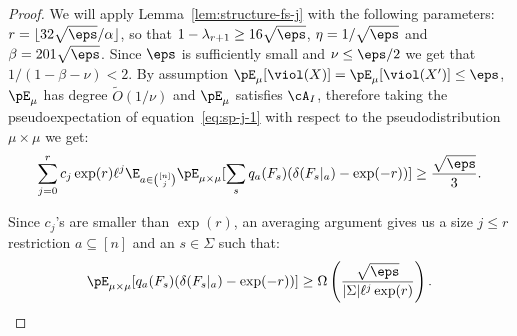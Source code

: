 \begin{proof}


We will apply Lemma~\ref{lem:structure-fs-j} with the following parameters: $r = \lfloor 32\sqrt{\eps}/\alpha \rfloor$, so that $1 - \lambda_{r+1} \geq 16\sqrt{\eps}$,  $\eta = 1/\sqrt{\eps}$ and $\beta = 201\sqrt{\eps}$.
Since $\eps$ is sufficiently small and $\nu \leq \eps/2$ we get that $1/(1 - \beta - \nu) < 2$. By assumption $\pE_\mu[\viol(X)] = \pE_\mu[\viol(X')] \le \eps$, $\pE_\mu$ has degree $\widetilde{O}(1/\nu)$ and $\pE_\mu$ satisfies $\cA_I$, therefore taking the pseudoexpectation of equation~\ref{eq:sp-j-1} with respect to the pseudodistribution $\mu \times \mu$ we get:
\begin{align}
\sum_{j = 0}^r c_j \exp(r) \ell^j \E_{a \in {[n] \choose j}}\pE_{\mu \times \mu}[\sum_{s}q_{a}(F_s)(\delta(F_s|_a) - \exp(-r))] \geq \frac{\sqrt{\eps}}{3}.    
\end{align}

Since $c_j$'s are smaller than $\exp(r)$, an averaging argument gives us a size $j \leq r$ restriction $a \subseteq [n]$ and an $s \in \Sigma$ such that:
\begin{equation}\label{eq:sp-j-2}
\pE_{\mu \times \mu}[q_{a}(F_s)(\delta(F_s|_a) - \exp(-r))] \geq \Omega\left(\frac{\sqrt{\eps}}{|\Sigma|\ell^{j}\exp(r)}\right).
\end{equation}


\end{proof}
